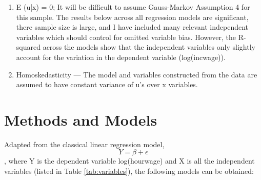 \documentclass[12pt, english]{article}
\begin{document}
\begin{itemize}
\begin{enumerate}
        \item E (u|x) = 0; It will be difficult to assume Gauss-Markov Assumption 4 for this sample. The results below across all regression models are significant, there sample size is large, and I have included many relevant independent variables which should control for omitted variable bias. However, the R-squared across the models show that the independent variables only slightly account for the variation in the dependent variable (log(incwage)). 
        \item Homoskedasticity — The model and variables constructed from the data are assumed to have constant variance of u’s over x variables.
    \end{enumerate}
\end{itemize}
\section{Methods and Models}
Adapted from the classical linear regression model, 
    \begin{equation}
        Y = \beta + \epsilon
    \end{equation}, where Y is the dependent variable log(hourwage) and X is all the independent variables (listed in Table \ref{tab:variables}), the following models can be obtained:
\end{document}
